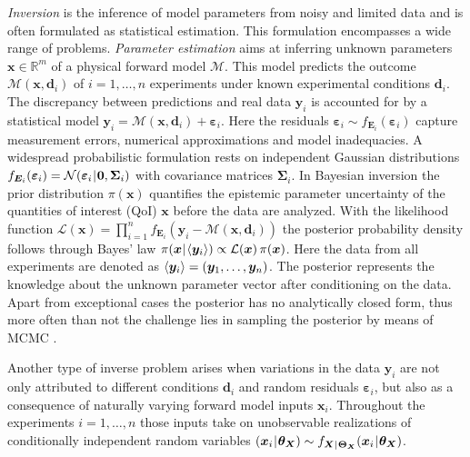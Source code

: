 \textit{Inversion} is the inference of model parameters from noisy and limited data and is often formulated as statistical estimation.
This formulation encompasses a wide range of problems.
\textit{Parameter estimation} \cite{Bayesian:Hadidi2008,Bayesian:Beck2010} aims at inferring unknown parameters \(\bm{x} \in \mathds{R}^m\) of a physical forward model \(\mathcal{M}\).
This model predicts the outcome \(\mathcal{M}(\bm{x},\bm{d}_i)\) of \(i=1,\ldots,n\) experiments under known experimental conditions \(\bm{d}_i\).
The discrepancy between predictions and real data \(\bm{y}_i\) is accounted for by a statistical model \(\bm{y}_i = \mathcal{M}(\bm{x},\bm{d}_i) + \bm{\varepsilon}_i\).
Here the residuals \(\bm{\varepsilon}_i \sim f_{\bm{E}_i}(\bm{\varepsilon}_i)\) capture measurement errors, numerical approximations and model inadequacies.
A widespread probabilistic formulation rests on independent Gaussian distributions \(f_{\bm{E}_i}(\bm{\varepsilon}_i) = \mathcal{N}(\bm{\varepsilon}_i {\:\!}|{\:\!} \bm{0},\bm{\Sigma}_i)\) with covariance matrices \(\bm{\Sigma}_i\).
In Bayesian inversion the prior distribution \(\pi(\bm{x})\) quantifies the epistemic parameter uncertainty of the quantities of interest (QoI) \(\bm{x}\) before the data are analyzed.
With the likelihood function \(\mathcal{L} (\bm{x}) = \prod_{i=1}^n f_{\bm{E}_i} (\bm{y}_i-\mathcal{M}(\bm{x},\bm{d}_i))\)
the posterior probability density follows through Bayes' law \(\pi(\bm{x} {\:\!}|{\:\!} \langle{\bm{y}_i}\rangle) \propto \mathcal{L}(\bm{x}) \, \pi(\bm{x})\).
Here the data from all experiments are denoted as \(\langle{\bm{y}_i}\rangle = (\bm{y}_1,\ldots,\bm{y}_n)\).
The posterior represents the knowledge about the unknown parameter vector after conditioning on the data.
Apart from exceptional cases the posterior has no analytically closed form, thus more often than not the challenge lies in sampling the posterior by means of MCMC \cite{MCMC:Robert2004,MCMC:Brooks2011}.
\par %
Another type of inverse problem arises when variations in the data \(\bm{y}_i\) are not only attributed to different conditions \(\bm{d}_i\) and random residuals \(\bm{\varepsilon}_i\),
but also as a consequence of naturally varying forward model inputs \(\bm{x}_i\).
Throughout the experiments \(i=1,\ldots,n\) those inputs take on unobservable realizations of conditionally independent random variables
\((\bm{x}_i {\:\!}|{\:\!} \bm{\theta}_{\bm{X}}) \sim f_{\bm{X} {\:\!}|{\:\!} \bm{\Theta}_{\bm{X}}} (\bm{x}_i {\:\!}|{\:\!} \bm{\theta}_{\bm{X}})\).

